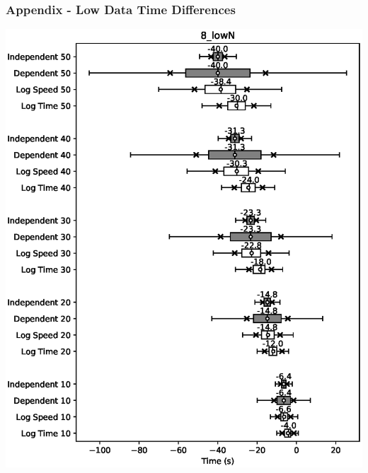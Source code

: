 \documentclass{beamer}
\begin{document}
	\begin{frame}
		\frametitle{Appendix - Low Data Time Differences}
		\hspace{1.6cm}\includegraphics[height=0.8\textheight]{8_lowN.eps}
	\end{frame}
\end{document}
